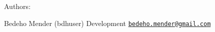 Authors\-:


\begin{DoxyItemize}
\item Bedeho Mender (bdhuser) Development \href{mailto:bedeho.mender@gmail.com}{\tt bedeho.\-mender@gmail.\-com} 
\end{DoxyItemize}